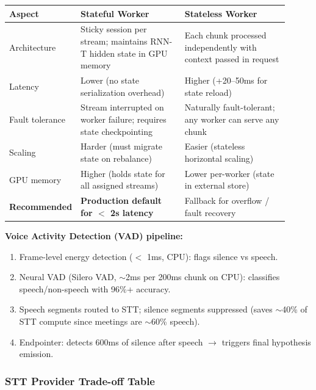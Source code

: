 \begin{tabular}{|p{0.15\linewidth}|p{0.38\linewidth}|p{0.38\linewidth}|}
\hline
\textbf{Aspect} & \textbf{Stateful Worker} & \textbf{Stateless Worker} \\
\hline
Architecture & Sticky session per stream; maintains RNN-T hidden state in GPU memory & Each chunk processed independently with context passed in request \\
\hline
Latency & Lower (no state serialization overhead) & Higher (+20--50ms for state reload) \\
\hline
Fault tolerance & Stream interrupted on worker failure; requires state checkpointing & Naturally fault-tolerant; any worker can serve any chunk \\
\hline
Scaling & Harder (must migrate state on rebalance) & Easier (stateless horizontal scaling) \\
\hline
GPU memory & Higher (holds state for all assigned streams) & Lower per-worker (state in external store) \\
\hline
\textbf{Recommended} & \textbf{Production default for $<$ 2s latency} & Fallback for overflow / fault recovery \\
\hline
\end{tabular}

\textbf{Voice Activity Detection (VAD) pipeline:}

\begin{enumerate}
  \item Frame-level energy detection ($<$ 1ms, CPU): flags silence vs speech.
  \item Neural VAD (Silero VAD, $\sim$2ms per 200ms chunk on CPU): classifies speech/non-speech with 96\%+ accuracy.
  \item Speech segments routed to STT; silence segments suppressed (saves $\sim$40\% of STT compute since meetings are $\sim$60\% speech).
  \item Endpointer: detects 600ms of silence after speech $\rightarrow$ triggers final hypothesis emission.
\end{enumerate}

\subsubsection*{STT Provider Trade-off Table}

